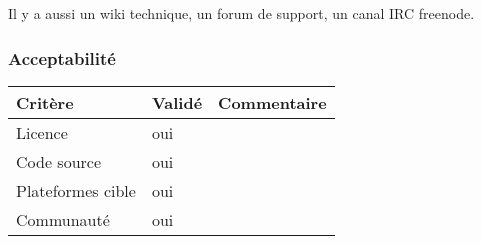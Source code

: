 Il y a aussi un wiki technique, un forum de support, un canal IRC freenode.

\subsubsection{Acceptabilité}
\begin{tabular}{lll}
\toprule
	Critère				&	Validé		&	Commentaire	\\
\midrule
	Licence				&	oui			&		\\
	Code source			&	oui			&		\\
	Plateformes cible	&	oui			&		\\
	Communauté			&	oui			&		\\
\bottomrule
\end{tabular}

